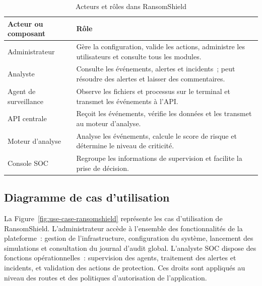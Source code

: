 \begin{table}[htbp]
\centering
\caption{Acteurs et rôles dans RansomShield}
\label{tab:acteurs-ransomshield}
\small
\renewcommand{\arraystretch}{1.3}
\begin{tabularx}{\textwidth}{|p{4cm}|X|}
\hline
\textbf{Acteur ou composant} & \textbf{Rôle} \\
\hline
Administrateur & Gère la configuration, valide les actions, administre les utilisateurs et consulte tous les modules. \\
\hline
Analyste & Consulte les événements, alertes et incidents~; peut résoudre des alertes et laisser des commentaires. \\
\hline
Agent de surveillance & Observe les fichiers et processus sur le terminal et transmet les événements à l'API. \\
\hline
API centrale & Reçoit les événements, vérifie les données et les transmet au moteur d'analyse. \\
\hline
Moteur d'analyse & Analyse les événements, calcule le score de risque et détermine le niveau de criticité. \\
\hline
Console SOC & Regroupe les informations de supervision et facilite la prise de décision. \\
\hline
\end{tabularx}
\end{table}

\subsection{Diagramme de cas d'utilisation}

La Figure~\ref{fig:use-case-ransomshield} représente les cas d'utilisation de RansomShield. L'administrateur accède à l'ensemble des fonctionnalités de la plateforme~: gestion de l'infrastructure, configuration du système, lancement des simulations et consultation du journal d'audit global. L'analyste SOC dispose des fonctions opérationnelles~: supervision des agents, traitement des alertes et incidents, et validation des actions de protection. Ces droits sont appliqués au niveau des routes et des politiques d'autorisation de l'application.

